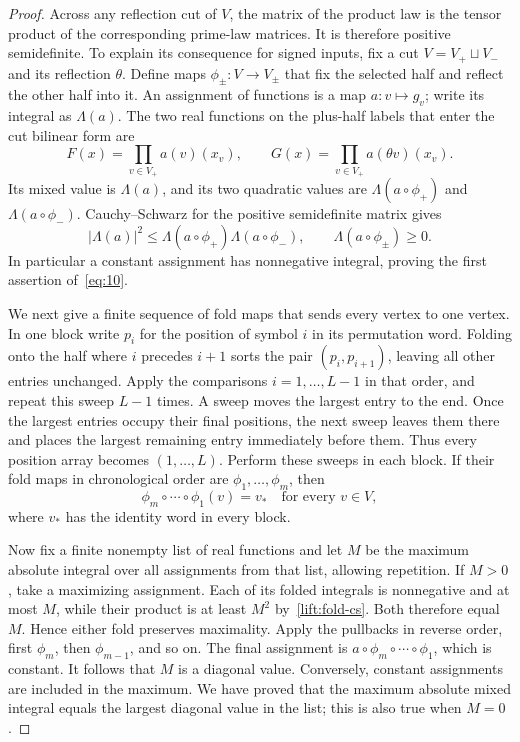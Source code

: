 \begin{proof}
Across any reflection cut of \(V\), the matrix of the product law is
the tensor product of the corresponding prime-law matrices.  It is
therefore positive semidefinite.  To explain its consequence for signed
inputs, fix a cut \(V=V_+\sqcup V_-\) and its reflection \(\theta\).
Define maps \(\phi_\pm:V\to V_\pm\) that fix the selected half and
reflect the other half into it.  An assignment of functions is a map
\(a:v\mapsto g_v\); write its integral as \(\Lambda(a)\).
The two real functions on the plus-half labels that enter the cut
bilinear form are
\[
 F(x)=\prod_{v\in V_+}a(v)(x_v),
 \qquad
 G(x)=\prod_{v\in V_+}a(\theta v)(x_v).
\]
Its mixed value is \(\Lambda(a)\), and its two quadratic values are
\(\Lambda(a\circ\phi_+)\) and \(\Lambda(a\circ\phi_-)\).
Cauchy--Schwarz for the positive semidefinite matrix gives
\begin{equation}
 |\Lambda(a)|^2
 \le \Lambda(a\circ\phi_+)\Lambda(a\circ\phi_-),
 \qquad \Lambda(a\circ\phi_\pm)\ge0.
 \label{lift:fold-cs}
\end{equation}
In particular a constant assignment has nonnegative integral, proving
the first assertion of~\eqref{eq:10}.

We next give a finite sequence of fold maps that sends every vertex to
one vertex.  In one block write \(p_i\) for the position of symbol
\(i\) in its permutation word.  Folding onto the half where \(i\)
precedes \(i+1\) sorts the pair \((p_i,p_{i+1})\), leaving all other
entries unchanged.  Apply the comparisons \(i=1,\ldots,L-1\) in that
order, and repeat this sweep \(L-1\) times.  A sweep moves the largest
entry to the end.  Once the largest entries occupy their final positions,
the next sweep leaves them there and places the largest remaining entry
immediately before them.  Thus every position array becomes
\((1,\ldots,L)\).  Perform these sweeps in each block.  If their fold
maps in chronological order are \(\phi_1,\ldots,\phi_m\), then
\[
 \phi_m\circ\cdots\circ\phi_1(v)=v_*
 \quad\text{for every }v\in V,
\]
where \(v_*\) has the identity word in every block.

Now fix a finite nonempty list of real functions and let \(M\) be the
maximum absolute integral over all assignments from that list, allowing
repetition.  If \(M>0\), take a maximizing assignment.  Each of its
folded integrals is nonnegative and at most \(M\), while their product
is at least \(M^2\) by~\eqref{lift:fold-cs}.  Both therefore equal
\(M\).  Hence either fold preserves maximality.  Apply the pullbacks
in reverse order, first \(\phi_m\), then \(\phi_{m-1}\), and so on.
The final assignment is
\(a\circ\phi_m\circ\cdots\circ\phi_1\), which is constant.  It
follows that \(M\) is a diagonal value.  Conversely, constant
assignments are included in the maximum.  We have proved that the
maximum absolute mixed integral equals the largest diagonal value in
the list; this is also true when \(M=0\).


\end{proof}
